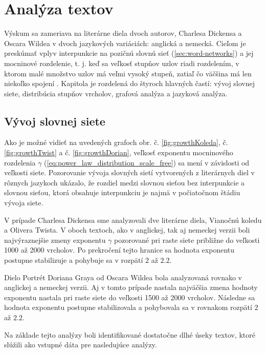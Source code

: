 \chapter{Analýza textov}\label{ch:textAnalysis}

Výskum sa zameriava na literárne diela dvoch autorov, Charlesa Dickensa a Oscara Wildea v dvoch jazykových variáciách: anglická a nemecká.
Cieľom je preskúmať vplyv interpunkcie na pozičnú slovnú sieť (\ref{sec:word-networks}) a jej mocninové rozdelenie, t. j. keď sa veľkosť stupňov
uzlov riadi rozdelením, v ktorom malé množstvo uzlov má veľmi vysoký stupeň, zatiaľ čo väčšina má len niekoľko spojení \cite{barabasi2016network}.
Kapitola je rozdelená do štyroch hlavných častí: vývoj slovnej siete, distribúcia stupňov vrcholov, grafová analýza a jazyková analýza.

\section{Vývoj slovnej siete}\label{sec:vyvojSlovnejSiete}

Ako je možné vidieť na uvedených grafoch obr. č. \ref{fig:growthKoleda}, č. \ref{fig:growthTwist} a č. \ref{fig:growthDorian},
veľkosť exponentu mocninového rozdelenia $\gamma$ (\ref{eq:power_law_distribution_scale_free}) sa mení v závislosti od veľkosti siete. Pozorovanie vývoja slovných sietí vytvorených z literárnych diel v rôznych
jazykoch ukázalo, že rozdiel medzi slovnou sieťou bez interpunkcie a slovnou sieťou, ktorá obsahuje interpunkciu je najmä v počiatočnom
štádiu vývoja siete. 

V prípade Charlesa Dickensa sme analyzovali dve literárne diela, Vianočnú koledu a Olivera Twista. V oboch textoch, ako v anglickej, tak aj nemeckej verzii
boli najvýraznejšie zmeny exponentu $\gamma$ pozorované pri raste siete približne do veľkosti 1000 až 2000 vrcholov. Po prekročení tejto hranice sa hodnota exponentu postupne stabilizuje
a pohybuje sa v rozpätí $2$ až $2.2$.

Dielo Portrét Doriana Graya od Oscara Wildea bola analyzovaná rovnako v anglickej a nemeckej verzii. Aj v tomto prípade nastala najväčšia zmena hodnoty exponentu nastala pri raste siete do
veľkosti 1500 až 2000 vrcholov. Následne sa hodnota exponentu postupne stabilizovala a pohybovala sa v rovnakom rozpätí $2$ až $2.2$.

Na základe tejto analýzy boli identifikované dostatočne dlhé úseky textov, ktoré slúžili ako vstupné dáta pre nasledujúce analýzy.

